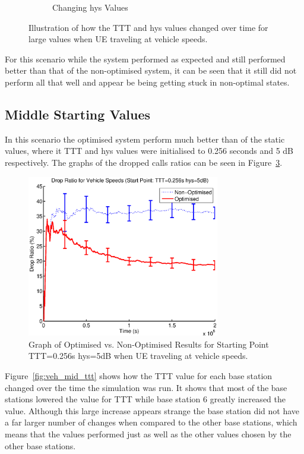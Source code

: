 \begin{figure}[H]
\begin{subfigure}[b]{0.49\textwidth}
                \caption{Changing hys Values}
                \label{fig:veh_high_hys}
        \end{subfigure}
        \caption{Illustration of how the TTT and hys values changed over time for large values when UE traveling at vehicle speeds.}\label{fig:veh_high_ttthys}
\end{figure}
For this scenario while the system performed as expected and still performed better than that of the non-optimised system, it can be seen that it still did not perform all that well and appear be being getting stuck in non-optimal states.
\subsection{Middle Starting Values}
In this scenario the optimised system perform much better than of the static values, where it TTT and hys values were initialised to 0.256 seconds and 5 dB respectively. The graphs of the dropped calls ratios can be seen in Figure~\ref{fig:veh_mid_drop}.
\begin{figure}[H]
  \begin{center}
    	  \includegraphics[width=0.75\textwidth]{figures/vehicle_figures/vehmid.eps}
    \end{center}
    \caption{Graph of Optimised vs. Non-Optimised Results for Starting Point TTT=0.256s hys=5dB when UE traveling at vehicle speeds.}
    \label{fig:veh_mid_drop}
\end{figure}
Figure~\ref{fig:veh_mid_ttt} shows how the TTT value for each base station changed over the time the simulation was run. It shows that most of the base stations lowered the value for TTT while base station 6 greatly increased the value. Although this large increase appears strange the base station did not have a far larger number of changes when compared to the other base stations, which means that the values performed just as well as the other values chosen by the other base stations. 

